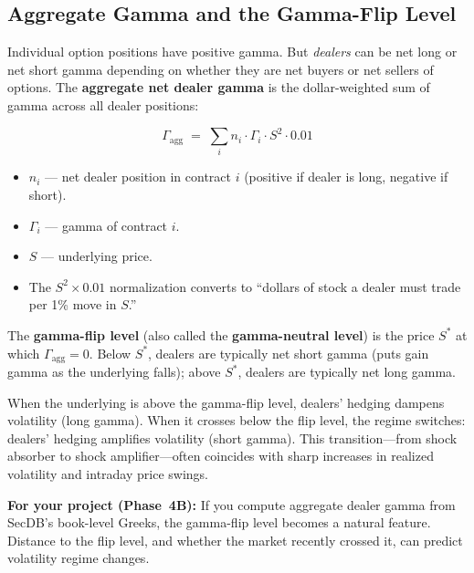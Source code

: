 \subsection{Aggregate Gamma and the Gamma-Flip Level}

Individual option positions have positive gamma.  But \emph{dealers}
can be net long or net short gamma depending on whether they are net
buyers or net sellers of options.  The \textbf{aggregate net dealer
gamma} is the dollar-weighted sum of gamma across all dealer
positions:

\begin{equation}
\label{eq:agg-gamma}
\Gamma_{\text{agg}} \;=\; \sum_{i} n_i \cdot \Gamma_i \cdot S^2
  \cdot 0.01
\end{equation}
\begin{itemize}[nosep]
  \item $n_i$ --- net dealer position in contract $i$ (positive if
        dealer is long, negative if short).
  \item $\Gamma_i$ --- gamma of contract $i$.
  \item $S$ --- underlying price.
  \item The $S^2 \times 0.01$ normalization converts to ``dollars of
        stock a dealer must trade per 1\% move in $S$.''
\end{itemize}

The \textbf{gamma-flip level} (also called the \textbf{gamma-neutral
level}) is the price $S^*$ at which $\Gamma_{\text{agg}} = 0$.  Below
$S^*$, dealers are typically net short gamma (puts gain gamma as the
underlying falls); above $S^*$, dealers are typically net long gamma.

\begin{keyidea}
When the underlying is above the gamma-flip level, dealers' hedging
dampens volatility (long gamma).  When it crosses below the flip
level, the regime switches: dealers' hedging amplifies volatility
(short gamma).  This transition---from shock absorber to shock
amplifier---often coincides with sharp increases in realized
volatility and intraday price swings.

\textbf{For your project (Phase~4B):} If you compute aggregate
dealer gamma from SecDB's book-level Greeks, the gamma-flip level
becomes a natural feature.  Distance to the flip level, and whether
the market recently crossed it, can predict volatility regime changes.
\end{keyidea}


